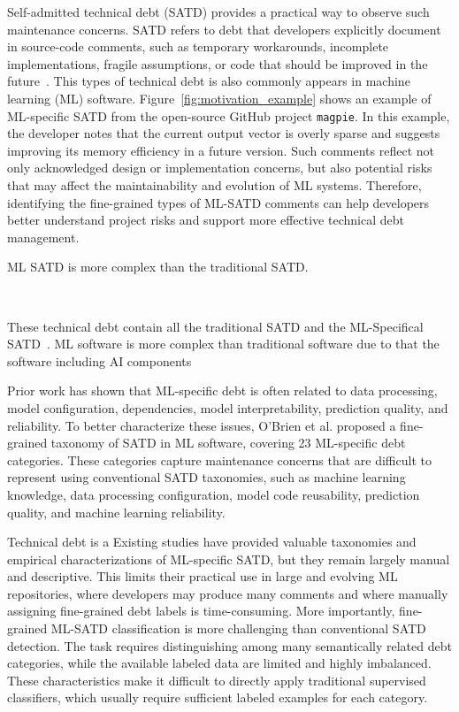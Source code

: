\documentclass[acmsmall,screen,review,anonymous]{acmart}
\begin{document}
Self-admitted technical debt (SATD) provides a practical way to observe such maintenance concerns. SATD refers to debt that developers explicitly document in source-code comments, such as temporary workarounds, incomplete implementations, fragile assumptions, or code that should be improved in the future~\cite{}. This types of technical debt is also commonly appears in machine learning (ML) software. Figure~\ref{fig:motivation_example} shows an example of ML-specific SATD from the open-source GitHub project \texttt{magpie}. In this example, the developer notes that the current output vector is overly sparse and suggests improving its memory efficiency in a future version. Such comments reflect not only acknowledged design or implementation concerns, but also potential risks that may affect the maintainability and evolution of ML systems. Therefore, identifying the fine-grained types of ML-SATD comments can help developers better understand project risks and support more effective technical debt management.



ML SATD is more complex than the traditional SATD. 

~\cite{bhatia2023empirical} ~\cite{} ~\cite{}


These technical debt contain all the traditional SATD and the ML-Specifical SATD~\cite{}. ML software is more complex than traditional software due to that the software including AI components 

Prior work has shown that ML-specific debt is often related to data processing, model configuration, dependencies, model interpretability, prediction quality, and reliability. To better characterize these issues, O'Brien et al. proposed a fine-grained taxonomy of SATD in ML software, covering 23 ML-specific debt categories. These categories capture maintenance concerns that are difficult to represent using conventional SATD taxonomies, such as machine learning knowledge, data processing configuration, model code reusability, prediction quality, and machine learning reliability.


Technical debt is a Existing studies have provided valuable taxonomies and empirical characterizations of ML-specific SATD, but they remain largely manual and descriptive. This limits their practical use in large and evolving ML repositories, where developers may produce many comments and where manually assigning fine-grained debt labels is time-consuming. More importantly, fine-grained ML-SATD classification is more challenging than conventional SATD detection. The task requires distinguishing among many semantically related debt categories, while the available labeled data are limited and highly imbalanced. These characteristics make it difficult to directly apply traditional supervised classifiers, which usually require sufficient labeled examples for each category.
\end{document}
